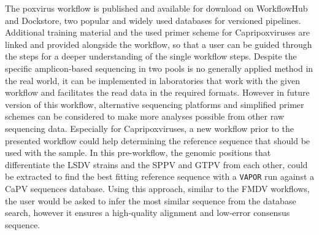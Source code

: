 The poxvirus workflow is published and available for download on WorkflowHub and Dockstore, two popular and widely used databases for versioned pipelines. Additional training material and the used primer scheme for Capripoxviruses are linked and provided alongside the workflow, so that a user can be guided through the steps for a deeper understanding of the single workflow steps. Despite the specific amplicon-based sequencing in two pools is no generally applied method in the real world, it can be implemented in laboratories that work with the given workflow and facilitates the read data in the required formats. However in future version of this workflow, alternative sequencing platforms and simplified primer schemes can be considered to make more analyses possible from other raw sequencing data. Especially for Capripoxviruses, a new workflow prior to the presented workflow could help determining the reference sequence that should be used with the sample. In this pre-workflow, the genomic positions that differentiate the \ac{LSDV} strains and the \ac{SPPV} and \ac{GTPV} from each other, could be extracted to find the best fitting reference sequence with a \texttt{VAPOR} run against a \ac{CaPV} sequences database. Using this approach, similar to the \ac{FMDV} workflows, the user would be asked to infer the most similar sequence from the database search, however it ensures a high-quality alignment and low-error consensus sequence. \\
